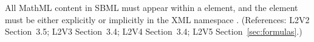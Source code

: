 All MathML content in SBML must appear within a 
element, and the  element must be either explicitly or
implicitly in the XML namespace
.  (References: L2V2
Section~3.5; L2V3 Section~3.4; L2V4 Section~3.4; L2V5 Section~\ref{sec:formulas}.)
